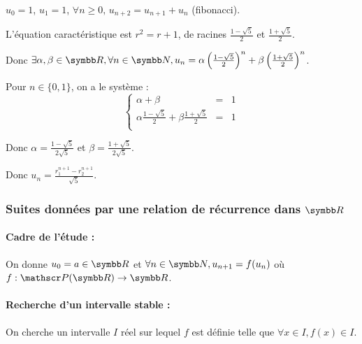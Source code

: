 \begin{exemple}
    $u_0 = 1$, $u_1 = 1$, $\forall n \geqslant 0, \, u_{n + 2} = u_{n + 1} + u_n$ (fibonacci).

    L'équation caractéristique est $r^2 = r + 1$, de racines $\frac{1 - \sqrt{5}} 2$ et $\frac{1 + \sqrt{5}} 2$.

    \svspace Donc $\exists \alpha, \beta \in \R, \forall n \in \N, u_n = \alpha \left(\frac{1 - \sqrt{5}} 2\right)^n + \beta \left(\frac{1 + \sqrt{5}} 2\right)^n$.

    Pour $n \in \{0, 1\}$, on a le système :
    \[\left\{
        \begin{array}{rcl}
            \alpha + \beta & = & 1 \\
            \alpha \frac{1 - \sqrt{5}} 2 + \beta \frac{1 + \sqrt{5}} 2 & = & 1 \\
        \end{array}
    \right.\]

    Donc $\alpha = \frac{1 - \sqrt{5}}{2\sqrt{5}}$ et $\beta = \frac{1 + \sqrt{5}}{2\sqrt{5}}$.
    
    Donc $\displaystyle u_n = \frac{r_1^{n + 1} - r_2^{n + 1}}{\sqrt 5}$.
\end{exemple}

\subsubsection{Suites données par une relation de récurrence dans $\R$}
\paragraph{Cadre de l'étude :}
On donne $u_0 = a \in \R$ et $\forall n \in \N, u_{n + 1} = f(u_n)$ où $f: \mathscr P(\R) \to \R$.

\paragraph{Recherche d'un intervalle stable :}
On cherche un intervalle $I$ réel sur lequel $f$ est définie
telle que $\forall x \in I, f(x) \in I$.

